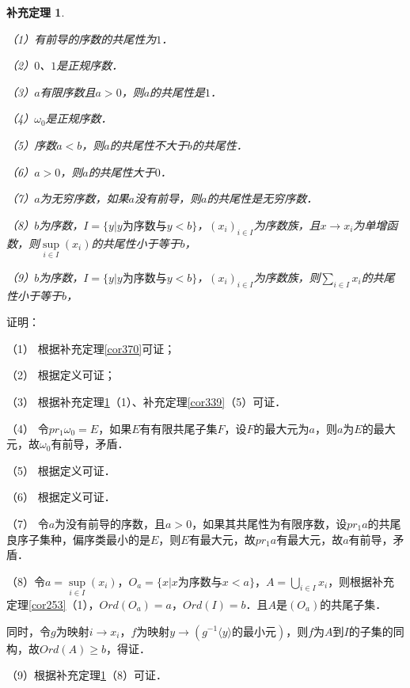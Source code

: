 \documentclass[12pt, a4paper, oneside]{book}
\newtheorem{cor}{补充定理}
\begin{document}
			\begin{cor}\label{cor371}
				\hfill\par
				（1）有前导的序数的共尾性为$1$．
				\par
				（2）$0$、$1$是正规序数．
				\par
				（3）$a$有限序数且$a>0$，则$a$的共尾性是$1$．
				\par
				（4）$\omega_0$是正规序数．
				\par
				（5）序数$a<b$，则$a$的共尾性不大于$b$的共尾性．
				\par
				（6）$a>0$，则$a$的共尾性大于$0$．
				\par
				（7）$a$为无穷序数，如果$a$没有前导，则$a$的共尾性是无穷序数．
				\par
				（8）$b$为序数，$I=\{y|y\text{为序数}\text{与}y<b\}$，$(x_i)_{i\in I}$为序数族，且$x\to x_i$为单增函数，则$\mathop{sup}\limits_{i\in I}(x_i)$的共尾性小于等于$b$，
				\par
				（9）$b$为序数，$I=\{y|y\text{为序数}\text{与}y<b\}$，$(x_i)_{i\in I}$为序数族，则$\sum\limits_{i\in I}x_i$的共尾性小于等于$b$，
			\end{cor}
			证明：
			\par
			（1）	根据补充定理\ref{cor370}可证；
			\par
			（2）	根据定义可证；
			\par
			（3）	根据补充定理\ref{cor371}（1）、补充定理\ref{cor339}（5）可证．
			\par
			（4）	令$pr_1\omega_0=E$，如果$E$有有限共尾子集$F$，设$F$的最大元为$a$，则$a$为$E$的最大元，故$\omega_0$有前导，矛盾．
			\par
			（5）	根据定义可证．
			\par
			（6）	根据定义可证．
			\par
			（7）	令$a$为没有前导的序数，且$a>0$，如果其共尾性为有限序数，设$pr_1a$的共尾良序子集种，偏序类最小的是$E$，则$E$有最大元，故$pr_1a$有最大元，故$a$有前导，矛盾．
			\par
			（8）令$a=\mathop{sup}\limits_{i\in I}(x_i)$，$O_a=\{x|x\text{为序数}\text{与}x<a\}$，$A=\bigcup\limits_{i\in I}x_i$，则根据补充定理\ref{cor253}（1），$Ord(O_a)=a$，$Ord(I)=b$．且$A$是$(O_a)$的共尾子集．
			\par
			同时，令$g$为映射$i\to x_i$，$f$为映射$y\to (g^{-1}\langle y \rangle \text{的最小元})$，则$f$为$A$到$I$的子集的同构，故$Ord(A)\geq b$，得证．
			\par
			（9）根据补充定理\ref{cor371}（8）可证．
			
\end{document}

